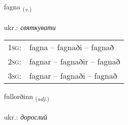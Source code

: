 \documentclass[frontgrid, backgrid]{flacards}\usepackage[]{graphicx}\usepackage[]{xcolor}
\begin{document}
\renewcommand{\flhead}{\vskip5pt \fboxsep=0pt {\small\bfseries\footnotesize Sagnorð | дієслово}}
\renewcommand{\fcfoot}{\vskip5pt \fboxsep=0pt \hspace{2pt}{\small\bfseries\footnotesize 2K}}

\renewcommand{\blhead}{\vskip5pt {\small\bfseries\footnotesize Sagnorð | дієслово }}
\renewcommand{\bcfoot}{\vskip5pt \hspace{2pt}{\small\bfseries\footnotesize 2K}}


{fagna \small{\textsubscript{(\textit{v.})}} \\[1ex] %
\textphonetic{[fakna]} \\
ukr.: \emph{святкувати} \\  [2ex]
\renewcommand*{\arraystretch}{0.8}
\begin{tabular}{p{1cm}l}
\textsc{1sg}: & fagna -- fagnaði -- fagnað \\ 
\textsc{2sg}: & fagnar -- fagnaðir -- fagnað \\ 
\textsc{3sg}: & fagnar -- fagnaði -- fagnað \\ 
\end{tabular}
}

\renewcommand{\flhead}{\vskip5pt \fboxsep=0pt {\small\bfseries\footnotesize Lýsingarorð | прикметник}}
\renewcommand{\fcfoot}{\vskip5pt \fboxsep=0pt \hspace{2pt}{\small\bfseries\footnotesize 2K}}

\renewcommand{\blhead}{\vskip5pt {\small\bfseries\footnotesize Lýsingarorð | прикметник }}
\renewcommand{\bcfoot}{\vskip5pt \hspace{2pt}{\small\bfseries\footnotesize 2K}}


{fullorðinn \small{\textsubscript{(\textit{adj.})}} \\[1ex] %
\textphonetic{[fʏtlɔrðɪn]} \\
ukr.: \emph{дорослий} \\  [2ex]
\renewcommand*{\arraystretch}{0.8}
}
\end{document}
